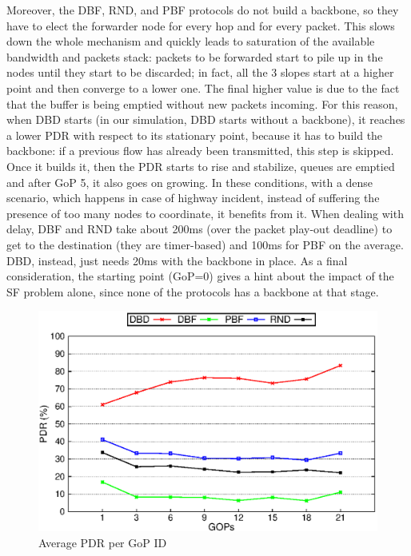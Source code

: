 \documentclass{acm_proc_article-sp}
\begin{document}
Moreover, the DBF, RND, and PBF protocols do not build a backbone, so they have to elect the forwarder node for every hop and for every packet. This slows down the whole mechanism and quickly leads to saturation of the available bandwidth and packets stack: packets to be forwarded start to pile up in the nodes until they start to be discarded; in fact, all the 3 slopes start at a higher point and then converge to a lower one. The final higher value is due to the fact that the buffer is being emptied without new packets incoming.
For this reason, when DBD starts (in our simulation, DBD starts without a backbone), it reaches a lower PDR with respect to its stationary point, because it has to build the backbone: if a previous flow has already been transmitted, this step is skipped. Once it builds it, then the PDR starts to rise and stabilize, queues are emptied and after GoP 5, it also goes on growing. In these conditions, with a dense scenario, which happens in case of highway incident, instead of suffering the presence of too many nodes to coordinate, it benefits from it.
When dealing with delay, DBF and RND take about 200ms (over the packet play-out deadline) to get to the destination (they are timer-based) and 100ms for PBF on the average. DBD, instead, just needs 20ms with the backbone in place. As a final consideration, the starting point (GoP=0) gives a hint about the impact of the SF problem alone, since none of the protocols has a backbone at that stage.


\begin{figure}[tb]
\begin{center}
\includegraphics[width=.9\columnwidth]{./fig/selected/LinePDRxGOPIDfinal.eps}
\caption{Average PDR per GoP ID}
\label{fig:qos}
\end{center}
\end{figure}
\end{document}
